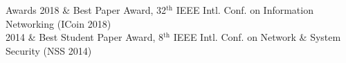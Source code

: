 %
%
%

\begin{rubriquetableau}[\offsetintab]{Awards}
  2018  & Best Paper Award, 32$^\text{th}$ IEEE Intl. Conf. on Information Networking (ICoin 2018)\hfill{}\\
  2014  & Best Student Paper Award, 8$^\text{th}$ IEEE Intl. Conf. on Network \& System Security (NSS 2014)\hfill{}\\
\end{rubriquetableau}

%
